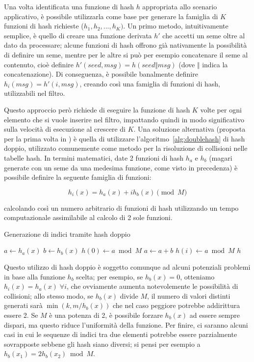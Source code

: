 Una volta identificata una funzione di hash $h$ appropriata allo scenario applicativo, è possibile
utilizzarla come base per generare la famiglia di $K$ funzioni di hash richieste ($h_1, h_2, ...,
h_K)$. Un primo metodo, intuitivamente semplice, è quello di creare una funzione derivata $h'$ che
accetti un seme oltre al dato da processare; alcune funzioni di hash offrono già nativamente la
possibilità di definire un seme, mentre per le altre si può per esempio concatenare il seme al
contenuto, cioè definire $h'(seed, msg) = h(seed \Vert msg)$ (dove $\Vert$ indica la
concatenazione). Di conseguenza, è possibile banalmente definire $h_i(msg) = h'(i, msg)$,
creando così una famiglia di funzioni di hash, utilizzabili nel filtro.

Questo approccio però richiede di eseguire la funzione di hash $K$ volte per ogni elemento che si
vuole inserire nel filtro, impattando quindi in modo significativo sulla velocità di esecuzione al
crescere di $K$. Una soluzione alternativa (proposta per la prima volta in \cite{bloomdoublehash}) è
quella di utilizzare l'algoritmo~\ref{alg:doublehash} di hash doppio, utilizzato comunemente come
metodo per la risoluzione di collisioni nelle tabelle hash. In termini matematici, date 2 funzioni
di hash $h_a$ e $h_b$ (magari generate con un seme da una medesima funzione, come visto in
precedenza) è possibile definire la seguente famiglia di funzioni:

$$ h_i(x) = h_a(x) + ih_b(x) \pmod M $$ 

calcolando così un numero arbitrario di funzioni di hash utilizzando un tempo computazionale
assimilabile al calcolo di 2 sole funzioni.

\begin{algorithm}
\caption{Generazione di indici tramite hash doppio}
\label{alg:doublehash}
\begin{algorithmic}[1]
	\State $a \gets h_a(x)$
	\State $b \gets h_b(x)$
	\State $h(0) \gets a \bmod M$
		\State $a \gets a+b$
		\State $h(i) \gets a \bmod M$
	\EndFor
	\State \Return $h$
\EndProcedure
\end{algorithmic}
\end{algorithm}

Questo utilizzo di hash doppio è soggetto comunque ad alcuni potenziali problemi in base alla
funzione $h_b$ scelta; per esempio, se $h_b(x) = 0$, otteniamo $h_i(x) = h_a(x) \; \forall i$, che
ovviamente aumenta notevolemente le possibilità di collisioni; allo stesso modo, se $h_b(x)$ divide
$M$, il numero di valori distinti generati sarà $\min(k, m/h_b(x))$ che nel caso peggiore potrebbe
addirittura essere \num{2}. Se $M$ è una potenza di \num{2}, è possibile forzare $h_b(x)$ ad essere
sempre dispari, ma questo riduce l'uniformità della funzione. Per finire, ci saranno alcuni casi in
cui le sequenze di indici tra due elementi potrebbe essere parzialmente sovrapposte sebbene gli hash
siano diversi; si pensi per esempio a $h_b(x_1) = 2h_b(x_2) \bmod M$.

